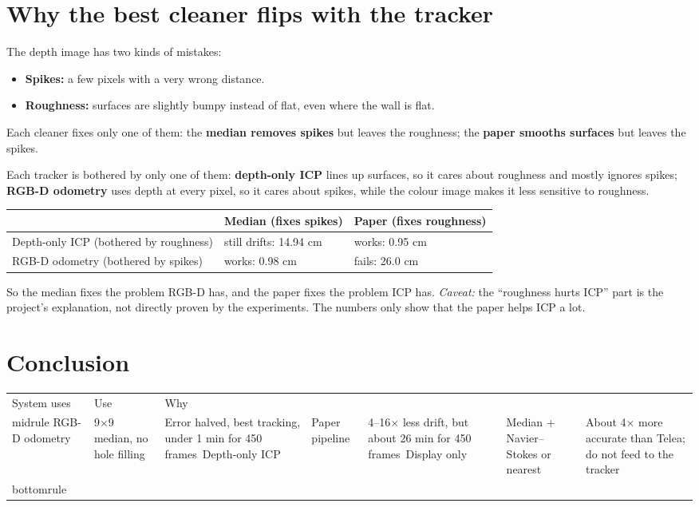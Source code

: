 \documentclass[11pt,a4paper]{article}
\begin{document}
\section*{Why the best cleaner flips with the tracker}
The depth image has two kinds of mistakes:
\begin{itemize}[nosep]
\item \textbf{Spikes:} a few pixels with a very wrong distance.
\item \textbf{Roughness:} surfaces are slightly bumpy instead of flat, even where the wall is flat.
\end{itemize}
Each cleaner fixes only one of them: the \textbf{median removes spikes} but leaves the roughness; the \textbf{paper smooths surfaces} but leaves the spikes.

Each tracker is bothered by only one of them: \textbf{depth-only ICP} lines up surfaces, so it cares about roughness and mostly ignores spikes; \textbf{RGB-D odometry} uses depth at every pixel, so it cares about spikes, while the colour image makes it less sensitive to roughness.
\begin{center}
\begin{tabular}{lll}\toprule
 & Median (fixes spikes) & Paper (fixes roughness)\\\midrule
Depth-only ICP (bothered by roughness) & still drifts: 14.94 cm & works: 0.95 cm\\
RGB-D odometry (bothered by spikes) & works: 0.98 cm & fails: 26.0 cm\\\bottomrule
\end{tabular}
\end{center}
So the median fixes the problem RGB-D has, and the paper fixes the problem ICP has. \emph{Caveat:} the ``roughness hurts ICP'' part is the project's explanation, not directly proven by the experiments. The numbers only show that the paper helps ICP a lot.

\section*{Conclusion}
\begin{center}
\begin{tabular}{p{4.2cm}p{4cm}p{6cm}}\toprule
System uses & Use & Why\\midrule
RGB-D odometry & 9$\times$9 median, no hole filling & Error halved, best tracking, under 1 min for 450 frames\
Depth-only ICP & Paper pipeline & 4--16$\times$ less drift, but about 26 min for 450 frames\
Display only & Median + Navier--Stokes or nearest & About 4$\times$ more accurate than Telea; do not feed to the tracker\\bottomrule
\end{tabular}
\end{center}
\end{document}
